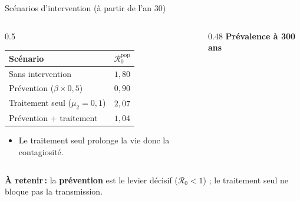 \documentclass[aspectratio=169,11pt,t]{beamer}
\newcommand{\Rzero}{\mathcal{R}_0}
\newcommand{\takeaway}[1]{\vfill\noindent{\color{gold}\vrule width 3pt}\colorbox{lightbg}{\parbox[c]{\dimexpr\textwidth-3pt-2\fboxsep\relax}{\vphantom{Ég}\small\textbf{\color{navy}À retenir\,:} #1\vphantom{Ég}}}\par}
\begin{document}
\begin{frame}{Scénarios d'intervention (à partir de l'an 30)}
    \begin{columns}[T,onlytextwidth]
        \begin{column}{0.5\textwidth}
            \small
            \begin{tabular}{l c}
                \toprule
                \textbf{Scénario} & $\Rzero^{\mathrm{pop}}$\\
                \midrule
                Sans intervention & $1{,}80$\\
                Prévention ($\beta\times0{,}5$) & $0{,}90$\\
                Traitement seul ($\mu_2=0{,}1$) & $2{,}07$\\
                Prévention + traitement & $1{,}04$\\
                \bottomrule
            \end{tabular}
            \vspace{0.2cm}
            \begin{itemize}
                \item Le traitement seul prolonge la vie donc la contagiosité.
            \end{itemize}
        \end{column}
        \begin{column}{0.48\textwidth}
            \footnotesize\textbf{Prévalence à 300 ans}\\[4pt]
        \end{column}
    \end{columns}
    \takeaway{la \textbf{prévention} est le levier décisif ($\Rzero<1$) ; le traitement seul ne bloque pas la transmission.}
\end{frame}

\end{document}
